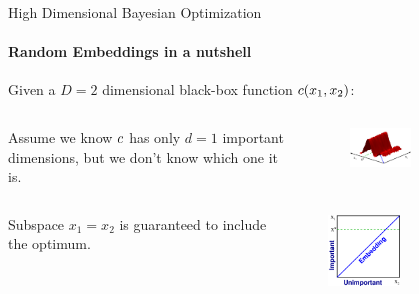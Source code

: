 \begin{frame}[c]{High Dimensional Bayesian Optimization}
\framesubtitle{Random Embeddings in a nutshell}

Given a $D=2$ dimensional black-box function $c(x_{1},x_{2})$:
\begin{itemize}
\begin{columns}[T]
\begin{column}{0.45\linewidth}


    \item Assume we know $c$ has only $d=1$ important dimensions, but we don't know which one it is.
    \end{column}
    \begin{column}{0.5\linewidth}
        \begin{figure}
    \includegraphics[width=0.5\textwidth]{images/highdim_images/Random embeddings in a nutshell1.png}
    \end{figure}
    \end{column}
\end{columns}
    \pause
    \begin{columns}[T]
    \begin{column}{0.45\linewidth}
    \vspace{-1em}
    \item Subspace $x_1=x_2$ is guaranteed to include the optimum.
        \end{column}
        \begin{column}{0.5\linewidth}
    \begin{figure}
    \includegraphics[width=0.5\textwidth]{images/highdim_images/Random embeddings in a nutshell2.png}

\end{figure}
\end{column}
\end{columns}
\end{itemize}
\end{frame}

